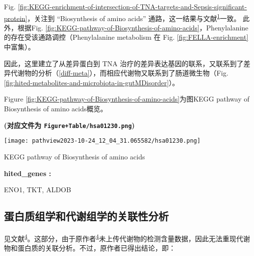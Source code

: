 \documentclass[
]{article}
\begin{document}
Fig. \ref{fig:KEGG-enrichment-of-intersection-of-TNA-targets-and-Sepsis-significant-protein}，关注到
``Biosynthesis of amino acids'' 通路，这一结果与文献\textsuperscript{\protect\hyperlink{ref-IntegrativeAnaChen2022}{1}}一致。
此外，根据Fig. \ref{fig:KEGG-pathway-of-Biosynthesis-of-amino-acids}，Phenylalanine 的存在受该通路调控（Phenylalanine metabolism 在 Fig. \ref{fig:FELLA-enrichment} 中富集）。

因此，这里建立了从差异蛋白到 TNA 治疗的差异表达基因的联系，又联系到了差异代谢物的分析（\ref{diff-meta}），而相应代谢物又联系到了肠道微生物（Fig. \ref{fig:hited-metabolites-and-microbiota-in-gutMDisorder}）。

Figure \ref{fig:KEGG-pathway-of-Biosynthesis-of-amino-acids}为图KEGG pathway of Biosynthesis of amino acids概览。

\textbf{(对应文件为 \texttt{Figure+Table/hsa01230.png})}

\def\@captype{figure}
\begin{center}
\texttt{[image: pathview2023-10-24\_12\_04\_31.065582/hsa01230.png]}
\caption{KEGG pathway of Biosynthesis of amino acids}\label{fig:KEGG-pathway-of-Biosynthesis-of-amino-acids}
\end{center}

\begin{center}\begin{tcolorbox}[colback=gray!10, colframe=gray!50, width=0.9\linewidth, arc=1mm, boxrule=0.5pt]
\textbf{
hited\_genes
:}

\vspace{0.5em}

    ENO1, TKT, ALDOB

\vspace{2em}
\end{tcolorbox}
\end{center}

\hypertarget{ux86cbux767dux8d28ux7ec4ux5b66ux548cux4ee3ux8c22ux7ec4ux5b66ux7684ux5173ux8054ux6027ux5206ux6790}{%
\subsection{蛋白质组学和代谢组学的关联性分析}\label{ux86cbux767dux8d28ux7ec4ux5b66ux548cux4ee3ux8c22ux7ec4ux5b66ux7684ux5173ux8054ux6027ux5206ux6790}}

见文献\textsuperscript{\protect\hyperlink{ref-SerumProteomicLiang2021}{4}}。这部分，由于原作者\textsuperscript{\protect\hyperlink{ref-SerumProteomicLiang2021}{4}}未上传代谢物的检测含量数据，因此无法重现代谢物和蛋白质的关联分析。不过，原作者已得出结论，即：
\end{document}
